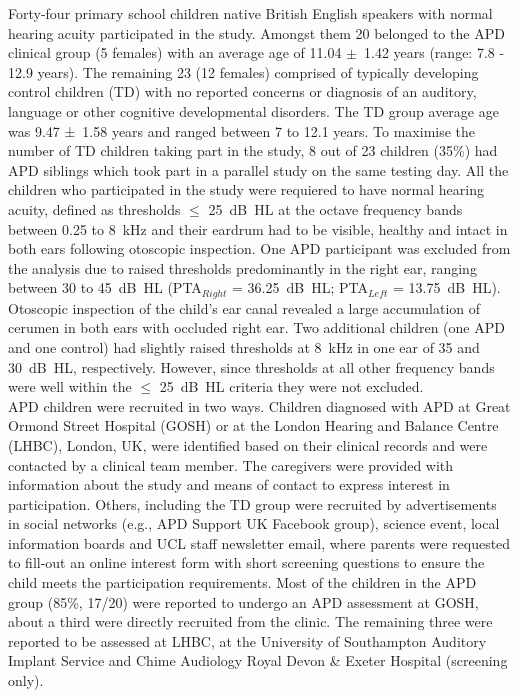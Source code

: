 \documentclass[a4paper, twoside]{templates/ociamthesis}
\begin{document}
Forty-four primary school children native British English speakers with normal hearing acuity participated in the study. Amongst them 20 belonged to the APD clinical group (5 females) with an average age of 11.04 \(\pm\)~1.42 years (range: 7.8 - 12.9 years). The remaining 23 (12 females) comprised of typically developing control children (TD) with no reported concerns or diagnosis of an auditory, language or other cognitive developmental disorders. The TD group average age was 9.47 ±~1.58 years and ranged between 7 to 12.1 years. To maximise the number of TD children taking part in the study, 8 out of 23 children (35\%) had APD siblings which took part in a parallel study on the same testing day. All the children who participated in the study were requiered to have normal hearing acuity, defined as thresholds \(\leq\) 25~dB~HL at the octave frequency bands between 0.25 to 8~kHz and their eardrum had to be visible, healthy and intact in both ears following otoscopic inspection. One APD participant was excluded from the analysis due to raised thresholds predominantly in the right ear, ranging between 30 to 45~dB~HL (PTA\(_{Right}\) = 36.25~dB~HL; PTA\(_{Left}\) = 13.75~dB~HL). Otoscopic inspection of the child's ear canal revealed a large accumulation of cerumen in both ears with occluded right ear. Two additional children (one APD and one control) had slightly raised thresholds at 8~kHz in one ear of 35 and 30~dB~HL, respectively. However, since thresholds at all other frequency bands were well within the \(\leq\) 25~dB~HL criteria they were not excluded.\\

APD children were recruited in two ways. Children diagnosed with APD at Great Ormond Street Hospital (GOSH) or at the London Hearing and Balance Centre (LHBC), London, UK, were identified based on their clinical records and were contacted by a clinical team member. The caregivers were provided with information about the study and means of contact to express interest in participation. Others, including the TD group were recruited by advertisements in social networks (e.g., APD Support UK Facebook group), science event, local information boards and UCL staff newsletter email, where parents were requested to fill-out an online interest form with short screening questions to ensure the child meets the participation requirements. Most of the children in the APD group (85\%, 17/20) were reported to undergo an APD assessment at GOSH, about a third were directly recruited from the clinic. The remaining three were reported to be assessed at LHBC, at the University of Southampton Auditory Implant Service and Chime Audiology Royal Devon \& Exeter Hospital (screening only).\\
\end{document}
